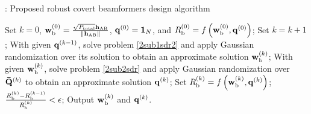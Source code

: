\documentclass[10pt,journal,letterpaper,twocolumn,twoside]{IEEEtran} %
\begin{document}
\begin{algorithm}[htb]
  \caption{: Proposed   robust covert beamformers design algorithm}
  \label{alg2:Alternate iteration}
  \begin{algorithmic}[1]
     Set $k = 0$, ${\bf{w}}_{\rm{b}}^{\left( 0 \right)} = \frac{{\sqrt {{P_{{\rm{total}}}}} {{\bf{h}}_{{\rm{AB}}}}}}{{\left\| {{{\bf{h}}_{{\rm{AB}}}}} \right\|}}$, ${{\bf{q}}^{\left( 0 \right)}} = {{\bf{1}}_N}$, and $R_{\rm{b}}^{\left( 0 \right)} = f\left( {{\bf{w}}_{\rm{b}}^{\left( 0 \right)},{{\bf{q}}^{\left( 0 \right)}}} \right)$;
     \State Set $k = k + 1$;
    \State  With given ${{\bf{q}}^{\left( {k - 1} \right)}}$, solve problem \eqref{2sub1sdr2} and apply Gaussian randomization over its solution to obtain an approximate solution ${{\bf{w}}_{\rm{b}}^{\left( k \right)}}$;
    \State With given ${{\bf{w}}_{\rm{b}}^{\left( k \right)}}$, solve problem \eqref{2sub2sdr} and apply Gaussian randomization over ${\bf{\bar Q}}^{\left( k \right)}$ to obtain an approximate solution ${{\bf{q}}^{\left( {k } \right)}}$;
   \State  Set $R_{\rm{b}}^{\left( k \right)} = f\left( {{\bf{w}}_{\rm{b}}^{\left( k \right)},{{\bf{q}}^{\left( k \right)}}} \right)$;
     $\frac{{R_{\rm{b}}^{\left( k \right)} - R_{\rm{b}}^{\left( {k - 1} \right)}}}{{R_{\rm{b}}^{\left( k \right)}}} < \epsilon  $;
        \State   Output ${{\bf{w}}_{\rm{b}}^{\left( k \right)}}$ and  ${{\bf{q}}^{\left( {k } \right)}}$.
  \end{algorithmic}
\end{algorithm}
\end{document}
